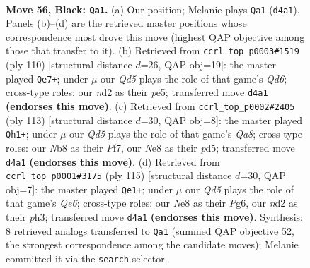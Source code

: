 \documentclass[11pt]{article}
\begin{document}
\clearpage

\begin{figure}[p]\centering
\begin{subfigure}{0.46\textwidth}\centering
\resizebox{\linewidth}{!}{%
\newchessgame
\chessboard[
  setfen={1n2n3/5k2/7p/Q7/P2q4/7K/3N4/8 b - - 12 56},
  showmover=false,
  pgfstyle=straightmove, color=movearrow, markmove={d4-a1}
]}
\caption{}
\end{subfigure}\hfill
\begin{subfigure}{0.46\textwidth}\centering
\resizebox{\linewidth}{!}{%
\newchessgame
\chessboard[
  setfen={8/6k1/3Q2p1/4p3/4q3/6PK/8/8 w - - 0 56},
  showmover=false,
  pgfstyle=straightmove, color=movearrow, markmove={d6-e7}
]}
\caption{}
\end{subfigure}
\\[4pt]
\begin{subfigure}{0.46\textwidth}\centering
\resizebox{\linewidth}{!}{%
\newchessgame
\chessboard[
  setfen={5k2/5p2/3p4/3P4/8/P2Q3K/8/q7 b - - 20 57},
  showmover=false,
  pgfstyle=straightmove, color=movearrow, markmove={a1-h1}
]}
\caption{}
\end{subfigure}\hfill
\begin{subfigure}{0.46\textwidth}\centering
\resizebox{\linewidth}{!}{%
\newchessgame
\chessboard[
  setfen={8/5p1k/Q5p1/P7/1K6/4q2P/8/8 b - - 9 58},
  showmover=false,
  pgfstyle=straightmove, color=movearrow, markmove={e3-e1}
]}
\caption{}
\end{subfigure}
\caption{\textbf{Move 56, Black: \texttt{Qa1}.} (a) Our position; Melanie plays \texttt{Qa1} (\texttt{d4a1}). Panels (b)--(d) are the retrieved master positions whose correspondence most drove this move (highest QAP objective among those that transfer to it). (b) Retrieved from \texttt{ccrl\_top\_p0003\#1519} (ply 110) [structural distance $d$=26, QAP obj=19]: the master played \texttt{Qe7+}; under $\mu$ our \emph{Qd5} plays the role of that game's \emph{Qd6}; cross-type roles: our \emph{n}d2 as their \emph{p}e5; transferred move \texttt{d4a1} \textbf{(endorses this move)}. (c) Retrieved from \texttt{ccrl\_top\_p0002\#2405} (ply 113) [structural distance $d$=30, QAP obj=8]: the master played \texttt{Qh1+}; under $\mu$ our \emph{Qd5} plays the role of that game's \emph{Qa8}; cross-type roles: our \emph{N}b8 as their \emph{P}f7, our \emph{N}e8 as their \emph{p}d5; transferred move \texttt{d4a1} \textbf{(endorses this move)}. (d) Retrieved from \texttt{ccrl\_top\_p0001\#3175} (ply 115) [structural distance $d$=30, QAP obj=7]: the master played \texttt{Qe1+}; under $\mu$ our \emph{Qd5} plays the role of that game's \emph{Qe6}; cross-type roles: our \emph{N}e8 as their \emph{P}g6, our \emph{n}d2 as their \emph{p}h3; transferred move \texttt{d4a1} \textbf{(endorses this move)}. Synthesis: 8 retrieved analogs transferred to \texttt{Qa1} (summed QAP objective 52, the strongest correspondence among the candidate moves); Melanie committed it via the \texttt{search} selector.}
\label{fig:thought-m111}
\end{figure}
\end{document}
